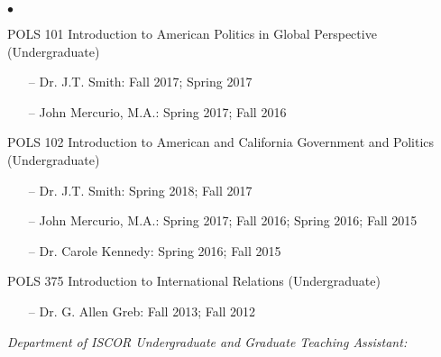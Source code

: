 \documentclass[letterpaper,12pt]{article}
\newenvironment{list2}{
  \begin{list}{$\bullet$}{%
      \setlength{\itemsep}{0in}
      \setlength{\parsep}{0in} 
      \setlength{\parskip}{0in}
      \setlength{\topsep}{0in} 
      \setlength{\partopsep}{0in}
      \setlength{\leftmargin}{1in}
      \setlength{\labelsep}{1em}
      \setlength{\labelwidth}{1em}
      \setlength{\itemindent}{-2em}
      \setlength{\listparindent}{2em}}}{\end{list}}
\begin{document}
\begin{list2}
    \item POLS 101 Introduction to American Politics in Global Perspective (Undergraduate)
        \begin{enumerate}[leftmargin=!,labelindent=0pt,itemindent=-15pt]
            \item[--] Dr. J.T. Smith: Fall 2017; Spring 2017
            \item[--] John Mercurio, M.A.: Spring 2017; Fall 2016
        \end{enumerate}
    \item POLS 102 Introduction to American and California Government and Politics (Undergraduate)
        \begin{enumerate}[leftmargin=!,labelindent=0pt,itemindent=-15pt]
            \item[--] Dr. J.T. Smith: Spring 2018; Fall 2017
            \item[--] John Mercurio, M.A.: Spring 2017; Fall 2016; Spring 2016; Fall 2015
            \item[--] Dr. Carole Kennedy: Spring 2016; Fall 2015
        \end{enumerate}
    \item POLS 375 Introduction to International Relations (Undergraduate)
        \begin{enumerate}[leftmargin=!,labelindent=0pt,itemindent=-15pt]
            \item[--] Dr. G. Allen Greb: Fall 2013; Fall 2012
        \end{enumerate}
\end{list2}
\par
\textit{Department of ISCOR Undergraduate and Graduate Teaching Assistant:}
\end{document}

